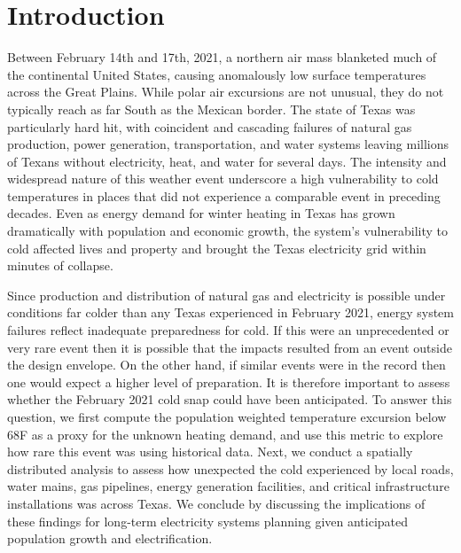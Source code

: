 \documentclass[12pt]{iopart}
\begin{document}
\maketitle

\section{Introduction}

Between February 14th and 17th, 2021, a northern air mass blanketed much of the continental United States, causing anomalously low surface temperatures across the Great Plains.
While polar air excursions are not unusual, they do not typically reach as far South as the Mexican border.
The state of Texas was particularly hard hit, with coincident and cascading failures of natural gas production, power generation, transportation, and water systems leaving millions of Texans without electricity, heat, and water for several days.
The intensity and widespread nature of this weather event underscore a high vulnerability to cold temperatures in places that did not experience a comparable event in preceding decades.
Even as energy demand for winter heating in Texas has grown dramatically with population and economic growth, the system’s vulnerability to cold affected lives and property and brought the Texas electricity grid within minutes of collapse.

Since production and distribution of natural gas and electricity is possible under conditions far colder than any Texas experienced in February 2021, energy system failures reflect inadequate preparedness for cold.
If this were an unprecedented or very rare event then it is possible that the impacts resulted from an event outside the design envelope.
On the other hand, if similar events were in the record then one would expect a higher level of preparation.
It is therefore important to assess whether the February 2021 cold snap could have been anticipated.
To answer this question, we first compute the population weighted temperature excursion below 68F as a proxy for the unknown heating demand, and use this metric to explore how rare this event was using historical data.
Next, we conduct a spatially distributed analysis to assess how unexpected the cold experienced by local roads, water mains, gas pipelines, energy generation facilities, and critical infrastructure installations was across Texas.
We conclude by discussing the implications of these findings for long-term electricity systems planning given anticipated population growth and electrification.
\end{document}
